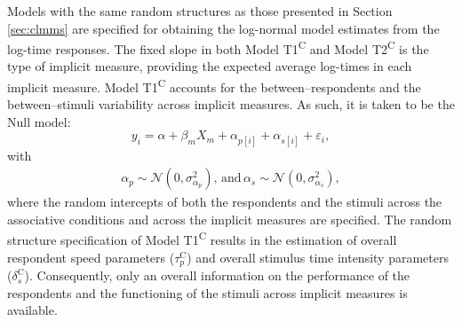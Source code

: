 \documentclass[12pt]{book}
\begin{document}
Models with the same random structures as those presented in Section \ref{sec:clmms} are specified for obtaining the log-normal model estimates from the log-time responses.
The fixed slope in both Model T1\textsuperscript{C} and Model T2\textsuperscript{C} is the type of implicit measure, providing the expected average log-times in each implicit measure. 
Model T1\textsuperscript{C} accounts for the between--respondents and the between--stimuli variability across implicit measures. As such, it is taken to be the Null model: 
%
\begin{equation}\label{eq:typeNullt}
	y_{i} = \alpha + \beta_mX_m + \alpha_{p[i]} +  \alpha_{s[i]} + \varepsilon_{i},
\end{equation}
with
\begin{align}
	\alpha_{p} \sim  \mathcal{N} ( 0, \sigma_{\alpha_p}^2), \, \text{and} \,	\alpha_{s}  \sim  \mathcal{N} (0,\sigma_{\alpha_s}^2),
\end{align}
where the random intercepts of both the respondents and the stimuli across the associative conditions and across the implicit measures are specified.
The random structure specification of Model T1\textsuperscript{C} results in the estimation of overall respondent speed parameters ($\tau_p^\text{C}$) and overall stimulus time intensity parameters ($\delta_s^\text{C}$). Consequently, only an overall information on the performance of the respondents and the functioning of the stimuli across implicit measures is available.
\end{document}
